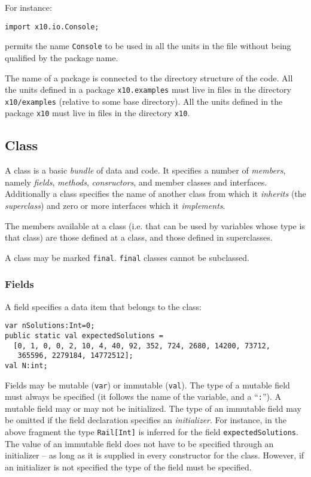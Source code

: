 For instance:
{\footnotesize
\begin{verbatim}
import x10.io.Console;
\end{verbatim}}

\noindent permits the name {\tt Console} to be used in all the units
in the file without being qualified by the package name.

The name of a package is connected to the directory structure of the
code. All the units defined in a package {\tt x10.examples} must
live in files in the directory {\tt x10/examples} (relative to some
base directory). All the units defined in the package {\tt x10}
must live in files in the directory {\tt x10}. 

\subsection{Class}

A class is a basic {\em bundle} of data and code. It specifies a number of
{\em members}, namely {\em fields}, {\em methods}, {\em consructors},
and member classes and interfaces.  Additionally a class specifies the name of
another class from which it {\em inherits} (the {\em superclass}) and zero
or more interfaces which it {\em implements}. 

The members available at a class (i.e.{} that can be used by variables
whose type is that class) are those defined at a class, and those
defined in superclasses.


A class may be marked {\tt final}. {\tt final} classes cannot be subclassed.

\subsubsection{Fields}

A field specifies a data item that belongs to the class:

{\footnotesize
\begin{verbatim}
var nSolutions:Int=0;
public static val expectedSolutions =
  [0, 1, 0, 0, 2, 10, 4, 40, 92, 352, 724, 2680, 14200, 73712, 
   365596, 2279184, 14772512];
val N:int;  
\end{verbatim}}

Fields may be mutable ({\tt var}) or immutable ({\tt val}). The type
of a mutable field must always be specified (it follows the name of
the variable, and a ``{\tt :}''). A mutable field may or may not be
initialized.  The type of an immutable field may be omitted if the
field declaration specifies an {\em initializer}.  For instance, in
the above fragment the type {\tt Rail[Int]} is inferred for the field
{\tt expectedSolutions}. The value of an immutable field does not have
to be specified through an initializer -- as long as it is supplied in
every constructor for the class. However, if an initializer is not
specified the type of the field must be specified.

